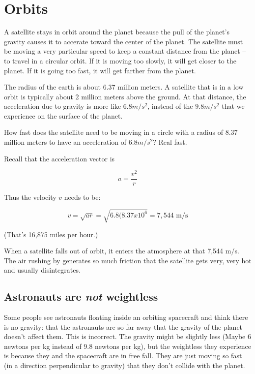 \chapter{Orbits}

A satellite stays in orbit around the planet because the pull of the
planet's gravity causes it to accerate toward the center of the
planet. The satellite must be moving a very particular speed to keep a
constant distance from the planet -- to travel in a circular orbit.
If it is moving too slowly, it will get closer to the planet.  If it
is going too fast, it will get farther from the planet.

The radius of the earth is about 6.37 million meters. A satellite that
is in a low orbit is typically about 2 million meters above the
ground. At that distance, the acceleration due to gravity is more like
$6.8 m/s^2$, instead of the $9.8 m/s^2$ that we experience on the
surface of the planet.

How fast does the satellite need to be moving in a circle with a
radius of 8.37 million meters to have an acceleration of $6.8 m/s^2$? Real fast.

Recall that the acceleration vector is

$$a = \frac{v^2}{r}$$

Thus the velocity $v$ needs to be:

$$v = \sqrt{a r} = \sqrt{6.8(8.37 x 10^6} = 7,544 \text{ m/s}$$

(That's 16,875 miles per hour.)

When a satellite falls out of orbit, it enters the atmosphere at that
7,544 m/s.  The air rushing by generates so much friction that the
satellite gets very, very hot and usually disintegrates.

\section{Astronauts are \emph{not} weightless}

Some people see astronauts floating inside an orbiting spacecraft and
think there is no gravity: that the astronauts are so far away that
the gravity of the planet doesn't affect them. This is incorrect.  The
gravity might be slightly less (Maybe 6 newtons per kg instead of 9.8
newtons per kg), but the weightless they experience is because they
and the spacecraft are in free fall.  They are just moving so fast (in
a direction perpendicular to gravity) that they don't collide with the
planet.

